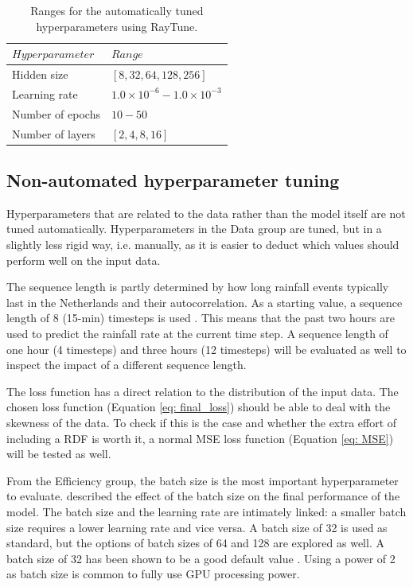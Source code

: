 \documentclass[twocolumn, 10pt, a4paper]{memoir}
\begin{document}
	\begin{table}
		\caption{Ranges for the automatically tuned hyperparameters using RayTune.}
		\label{tab: raytunetable}
		\centering
		\renewcommand{\arraystretch}{1.5}
		\begin{tabular}{P{3.5cm}P{3.2cm}}
			\hline
			$Hyperparameter$&$Range$\\
			\hline
			Hidden size&$[8,32,64,128,256]$\\
			Learning rate&$1.0\times 10^{-6} - 1.0\times 10^{-3}$\\
			Number of epochs&$10 - 50$\\
			Number of layers&$[2,4,8,16]$\\
			\hline
		\end{tabular}
	\end{table}
	
	\subsection{Non-automated hyperparameter tuning} \label{sec: Nonauto tuning}
	Hyperparameters that are related to the data rather than the model itself are not tuned automatically. Hyperparameters in the Data group are tuned, but in a slightly less rigid way, i.e. manually, as it is easier to deduct which values should perform well on the input data.
	
	The sequence length is partly determined by how long rainfall events typically last in the Netherlands and their autocorrelation. As a starting value, a sequence length of 8 (15-min) timesteps is used \cite{Beek2012}. This means that the past two hours are used to predict the rainfall rate at the current time step. A sequence length of one hour (4 timesteps) and three hours (12 timesteps) will be evaluated as well to inspect the impact of a different sequence length.
	
	The loss function has a direct relation to the distribution of the input data. The chosen loss function (Equation \ref{eq: final_loss}) should be able to deal with the skewness of the data. To check if this is the case and whether the extra effort of including a RDF is worth it, a normal MSE loss function (Equation \ref{eq: MSE}) will be tested as well.
	
	From the Efficiency group, the batch size is the most important hyperparameter to evaluate.  described the effect of the batch size on the final performance of the model. The batch size and the learning rate are intimately linked: a smaller batch size requires a lower learning rate and vice versa. A batch size of 32 is used as standard, but the options of batch sizes of 64 and 128 are explored as well. A batch size of 32 has been shown to be a good default value \cite{Bengio2012}. Using a power of 2 as batch size is common to fully use GPU processing power.
	
\end{document}
